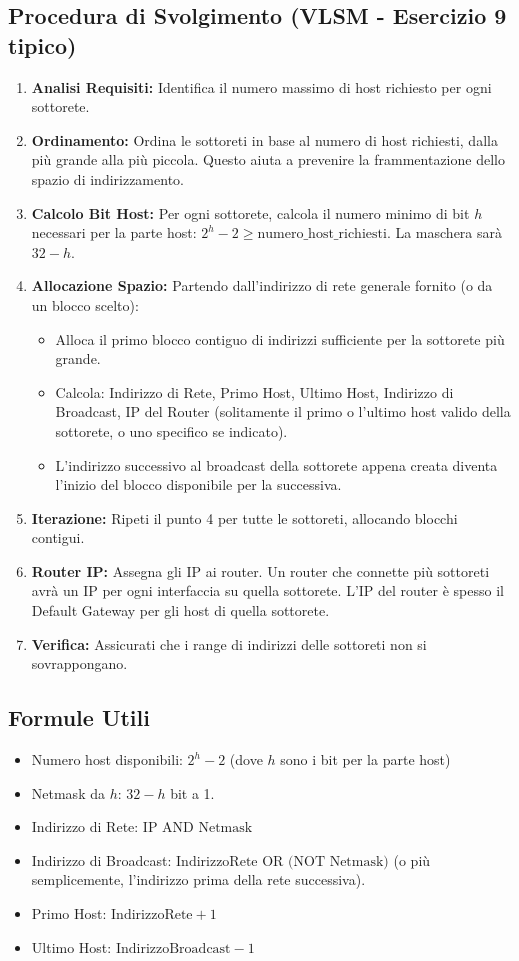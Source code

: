 \subsection{Procedura di Svolgimento (VLSM - Esercizio 9 tipico)}
\begin{enumerate}[label=\arabic*.]
    \item \textbf{Analisi Requisiti:} Identifica il numero massimo di host richiesto per ogni sottorete.
    \item \textbf{Ordinamento:} Ordina le sottoreti in base al numero di host richiesti, dalla più grande alla più piccola. Questo aiuta a prevenire la frammentazione dello spazio di indirizzamento.
    \item \textbf{Calcolo Bit Host:} Per ogni sottorete, calcola il numero minimo di bit $h$ necessari per la parte host: $2^h - 2 \ge \text{numero\_host\_richiesti}$. La maschera sarà $32 - h$.
    \item \textbf{Allocazione Spazio:} Partendo dall'indirizzo di rete generale fornito (o da un blocco scelto):
    \begin{itemize}
        \item Alloca il primo blocco contiguo di indirizzi sufficiente per la sottorete più grande.
        \item Calcola: Indirizzo di Rete, Primo Host, Ultimo Host, Indirizzo di Broadcast, IP del Router (solitamente il primo o l'ultimo host valido della sottorete, o uno specifico se indicato).
        \item L'indirizzo successivo al broadcast della sottorete appena creata diventa l'inizio del blocco disponibile per la successiva.
    \end{itemize}
    \item \textbf{Iterazione:} Ripeti il punto 4 per tutte le sottoreti, allocando blocchi contigui.
    \item \textbf{Router IP:} Assegna gli IP ai router. Un router che connette più sottoreti avrà un IP per ogni interfaccia su quella sottorete. L'IP del router è spesso il Default Gateway per gli host di quella sottorete.
    \item \textbf{Verifica:} Assicurati che i range di indirizzi delle sottoreti non si sovrappongano.
\end{enumerate}

\subsection{Formule Utili}
\begin{itemize}
    \item Numero host disponibili: $2^h - 2$ (dove $h$ sono i bit per la parte host)
    \item Netmask da $h$: $32 - h$ bit a 1.
    \item Indirizzo di Rete: $\text{IP AND Netmask}$
    \item Indirizzo di Broadcast: $\text{IndirizzoRete OR (NOT Netmask)}$ (o più semplicemente, l'indirizzo prima della rete successiva).
    \item Primo Host: $\text{IndirizzoRete} + 1$
    \item Ultimo Host: $\text{IndirizzoBroadcast} - 1$
\end{itemize}

